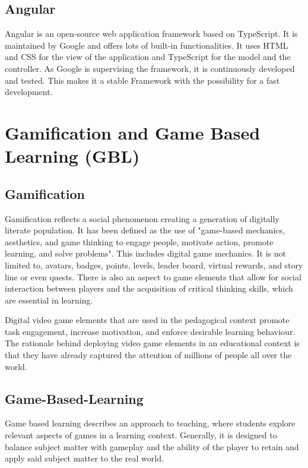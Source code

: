 \subsection{Angular}\label{subsec:angular}
Angular is an open-source web application framework based on TypeScript.
It is maintained by Google and offers lots of built-in functionalities.
It uses HTML and CSS for the view of the application and TypeScript for the model and the controller.
As Google is supervising the framework, it is continuously developed and tested.
This makes it a stable Framework with the possibility for a fast development.

\section{Gamification and Game Based Learning (GBL)}\label{sec:gamification-and-game-based-learninggbl}
\subsection{Gamification}\label{subsec:gamification}
Gamification reflects a social phenomenon creating a generation of digitally literate population.
It has been defined as the use of "game-based mechanics, aesthetics, and game thinking to engage people,
motivate action, promote learning, and solve problems"\cite{kapp2013gamification}.
This includes digital game mechanics. It is not limited to, avatars, badges, points, levels,
leader board, virtual rewards, and story line or even quests.
There is also an aspect to game elements that allow for social interaction between players and the acquisition of
critical thinking skills, which are essential in learning.

Digital video game elements that are used in the pedagogical context promote task engagement, increase motivation,
and enforce desirable learning behaviour.
The rationale behind deploying video game elements in an educational context is that they have already captured the
attention of millions of people all over the world.

\subsection{Game-Based-Learning}\label{subsec:game-based-learning}
Game based learning describes an approach to teaching,
where students explore relevant aspects of games in a learning context.
Generally, it is designed to balance subject matter with gameplay and the ability of the player
to retain and apply said subject matter to the real world.

